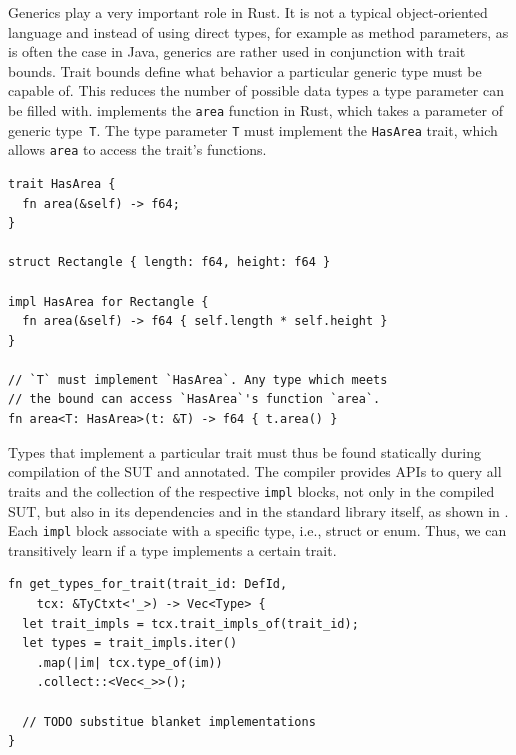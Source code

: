 \documentclass[paper=a4,%
  twoside,%
  BCOR4mm,%
  abstract=true,%
  toc=bibliography,%
  chapterprefix=true,%
  toc=bibliographynumbered,%
  open=right,%
  english,%
  pagesize=pdftex]{scrreprt}
\newcommand{\sut}{\ac{SUT}\xspace}
\begin{document}
Generics play a very important role in Rust. It is not a typical object-oriented language and instead of using direct types, for example as method parameters, as is often the case in Java, generics are rather used in conjunction with trait bounds. Trait bounds define what behavior a particular generic type must be capable of. This reduces the number of possible data types a type parameter can be filled with.  implements the \texttt{area} function in Rust, which takes a parameter of generic type~\texttt{T}. The type parameter \texttt{T} must implement the \texttt{HasArea} trait, which allows \texttt{area} to access the trait's functions. %

\begin{lstlisting}[style=boxed, caption={A function that takes a generic types and specifies a bound}, label=lst:trait-bounds-example]
trait HasArea {
  fn area(&self) -> f64;
}

struct Rectangle { length: f64, height: f64 }

impl HasArea for Rectangle {
  fn area(&self) -> f64 { self.length * self.height }
}

// `T` must implement `HasArea`. Any type which meets
// the bound can access `HasArea`'s function `area`.
fn area<T: HasArea>(t: &T) -> f64 { t.area() }
\end{lstlisting}

Types that implement a particular trait must thus be found statically during compilation of the \sut and annotated. The compiler provides \acp{API} to query all traits and the collection of the respective \texttt{impl} blocks, not only in the compiled \sut, but also in its dependencies and in the standard library itself, as shown in . Each \texttt{impl} block associate with a specific type, i.e., struct or enum. Thus, we can transitively learn if a type implements a certain trait. 

\begin{lstlisting}[style=boxed, caption={Query types for a trait}, label=lst:query-types-that-implement-trait]
fn get_types_for_trait(trait_id: DefId, 
    tcx: &TyCtxt<'_>) -> Vec<Type> {
  let trait_impls = tcx.trait_impls_of(trait_id);
  let types = trait_impls.iter()
    .map(|im| tcx.type_of(im))
    .collect::<Vec<_>>();

  // TODO substitue blanket implementations
}
\end{lstlisting}
\end{document}
